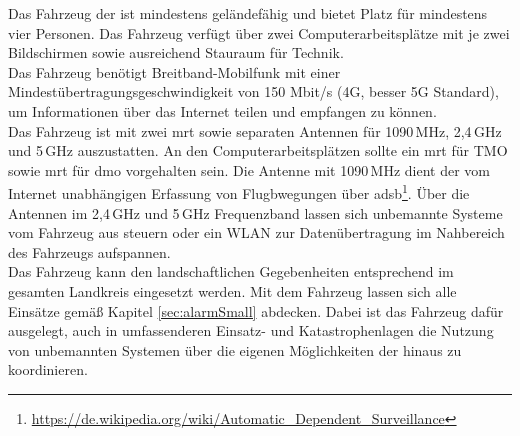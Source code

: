 Das Fahrzeug der \callee{} ist mindestens geländefähig und bietet Platz für mindestens vier Personen. Das Fahrzeug verfügt über zwei Computerarbeitsplätze mit je zwei Bildschirmen sowie ausreichend Stauraum für Technik.\\

\noindent Das Fahrzeug benötigt Breitband-Mobilfunk mit einer Mindestübertragungsgeschwindigkeit von 150 Mbit/s (4G, besser 5G Standard), um Informationen über das Internet teilen und empfangen zu können.\\

\noindent Das Fahrzeug ist mit zwei \ac{mrt} sowie separaten Antennen für 1090\,MHz, 2,4\,GHz und 5\,GHz auszustatten. An den Computerarbeitsplätzen sollte ein \ac{mrt} für TMO sowie \ac{mrt} für \ac{dmo} vorgehalten sein. Die Antenne mit 1090\,MHz dient der vom Internet unabhängigen Erfassung von Flugbwegungen über \acs{adsb}\footnote{\url{https://de.wikipedia.org/wiki/Automatic_Dependent_Surveillance}}. Über die Antennen im 2,4\,GHz und 5\,GHz Frequenzband lassen sich unbemannte Systeme vom Fahrzeug aus steuern oder ein WLAN zur Datenübertragung im Nahbereich des Fahrzeugs aufspannen.\\

\noindent Das Fahrzeug kann den landschaftlichen Gegebenheiten entsprechend im gesamten Landkreis \district{} eingesetzt werden. Mit dem Fahrzeug lassen sich alle Einsätze gemäß Kapitel \ref{sec:alarmSmall} abdecken. Dabei ist das Fahrzeug dafür ausgelegt, auch in umfassenderen Einsatz- und Katastrophenlagen die Nutzung von unbemannten Systemen über die eigenen Möglichkeiten der \callee{} hinaus zu koordinieren.
